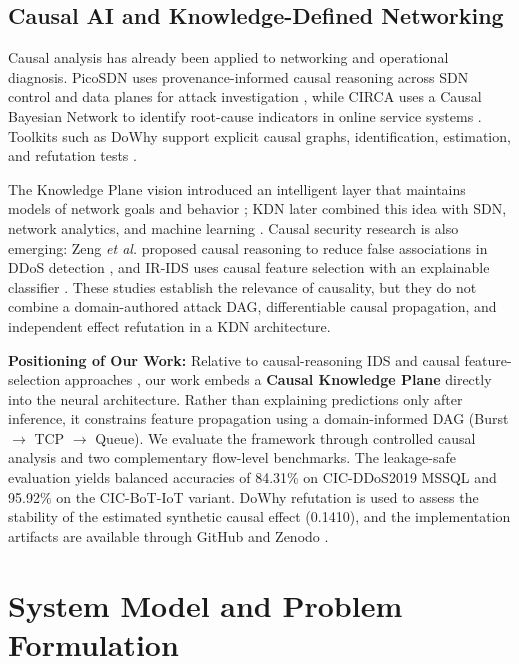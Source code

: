 \documentclass[journal]{IEEEtran}
\begin{document}
\subsection{Causal AI and Knowledge-Defined Networking}

Causal analysis has already been applied to networking and operational diagnosis. PicoSDN uses provenance-informed causal reasoning across SDN control and data planes for attack investigation \cite{ujcich2021causal_sdn}, while CIRCA uses a Causal Bayesian Network to identify root-cause indicators in online service systems \cite{li2022circa}. Toolkits such as DoWhy support explicit causal graphs, identification, estimation, and refutation tests \cite{sharma2020dowhy}.

The Knowledge Plane vision introduced an intelligent layer that maintains models of network goals and behavior \cite{clark2003knowledgeplane}; KDN later combined this idea with SDN, network analytics, and machine learning \cite{mestres2017kdn}. Causal security research is also emerging: Zeng \textit{et al.} proposed causal reasoning to reduce false associations in DDoS detection \cite{zeng2022causal_ddos}, and IR-IDS uses causal feature selection with an explainable classifier \cite{gao2025irids}. These studies establish the relevance of causality, but they do not combine a domain-authored attack DAG, differentiable causal propagation, and independent effect refutation in a KDN architecture.

\textbf{Positioning of Our Work:} Relative to causal-reasoning IDS
\cite{zeng2022causal_ddos} and causal feature-selection approaches
\cite{gao2025irids}, our work embeds a \textbf{Causal Knowledge Plane}
directly into the neural architecture. Rather than explaining predictions
only after inference, it constrains feature propagation using a
domain-informed DAG (Burst $\rightarrow$ TCP $\rightarrow$ Queue). We
evaluate the framework through controlled causal analysis and two
complementary flow-level benchmarks. The leakage-safe evaluation yields
balanced accuracies of 84.31\% on CIC-DDoS2019 MSSQL and 95.92\% on the
CIC-BoT-IoT variant. DoWhy refutation is used to assess the stability of the
estimated synthetic causal effect (0.1410), and the implementation artifacts are available through
GitHub and Zenodo
\cite{our_github_repository,our_zenodo_archive}.

\section{System Model and Problem Formulation}
\label{sec:system_model}
\end{document}
